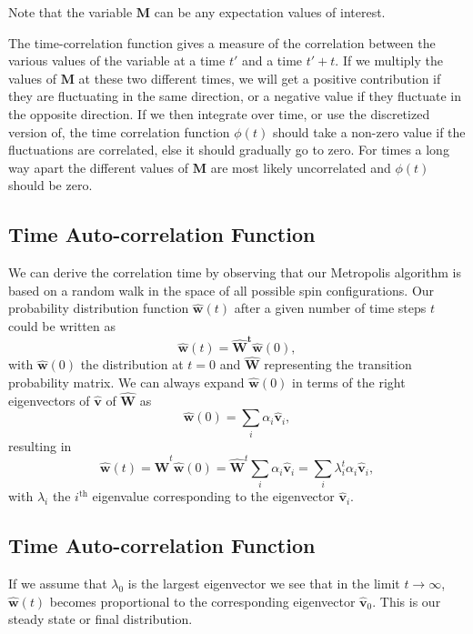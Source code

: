 \documentclass[%
oneside,                 %
final,                   %
10pt]{article}
\begin{document}
Note that the variable $\mathbf{M}$ can be any expectation values of interest.

The time-correlation function gives a measure of the correlation between the various values of the variable 
at a time $t'$ and a time $t'+t$. If we multiply the values of $\mathbf{M}$ at these two different times,
we will get a positive contribution if they are fluctuating in the same direction, or a negative value
if they fluctuate in the opposite direction. If we then integrate over time, or use the discretized version of, the time correlation function $\phi(t)$ should take a non-zero value if the fluctuations are 
correlated, else it should gradually go to zero. For times a long way apart 
the different values of $\mathbf{M}$  are most likely 
uncorrelated and $\phi(t)$ should be zero.

\subsection*{Time Auto-correlation Function}

We can derive the correlation time by observing that our Metropolis algorithm is based on a random
walk in the space of all  possible spin configurations. 
Our probability 
distribution function $\mathbf{\hat{w}}(t)$ after a given number of time steps $t$ could be written as
\[
   \mathbf{\hat{w}}(t) = \mathbf{\hat{W}^t\hat{w}}(0),
\]
with $\mathbf{\hat{w}}(0)$ the distribution at $t=0$ and $\mathbf{\hat{W}}$ representing the 
transition probability matrix. 
We can always expand $\mathbf{\hat{w}}(0)$ in terms of the right eigenvectors of 
$\mathbf{\hat{v}}$ of $\mathbf{\hat{W}}$ as 
\[
    \mathbf{\hat{w}}(0)  = \sum_i\alpha_i\mathbf{\hat{v}}_i,
\]
resulting in 
\[
   \mathbf{\hat{w}}(t) = \mathbf{\hat{W}}^t\mathbf{\hat{w}}(0)=\mathbf{\hat{W}}^t\sum_i\alpha_i\mathbf{\hat{v}}_i=
\sum_i\lambda_i^t\alpha_i\mathbf{\hat{v}}_i,
\]
with $\lambda_i$ the $i^{\mathrm{th}}$ eigenvalue corresponding to  
the eigenvector $\mathbf{\hat{v}}_i$. 

\subsection*{Time Auto-correlation Function}

If we assume that $\lambda_0$ is the largest eigenvector we see that in the limit $t\rightarrow \infty$,
$\mathbf{\hat{w}}(t)$ becomes proportional to the corresponding eigenvector 
$\mathbf{\hat{v}}_0$. This is our steady state or final distribution. 
\end{document}
